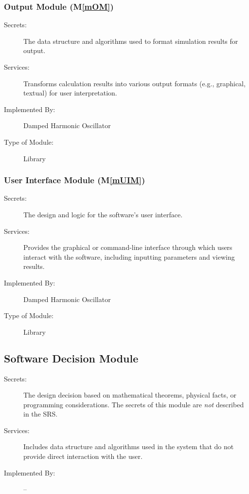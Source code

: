 \documentclass[12pt, titlepage]{article}
\newcommand{\mref}[1]{M\ref{#1}}
\begin{document}
\subsubsection{Output Module (\mref{mOM})}

\begin{description}
\item[Secrets:]The data structure and algorithms used to format simulation results for output.
\item[Services:]Transforms calculation results into various output formats (e.g., graphical, textual) for user interpretation.
\item[Implemented By:] Damped Harmonic Oscillator
\item[Type of Module:] Library
\end{description}

\subsubsection{User Interface Module (\mref{mUIM})}

\begin{description}
\item[Secrets:]The design and logic for the software's user interface.
\item[Services:]Provides the graphical or command-line interface through which users interact with the software, including inputting parameters and viewing results.
\item[Implemented By:] Damped Harmonic Oscillator
\item[Type of Module:] Library
\end{description}


\subsection{Software Decision Module}

\begin{description}
\item[Secrets:] The design decision based on mathematical theorems, physical
  facts, or programming considerations. The secrets of this module are
  \emph{not} described in the SRS.
\item[Services:] Includes data structure and algorithms used in the system that
  do not provide direct interaction with the user. 
\item[Implemented By:] --
\end{description}
\end{document}
